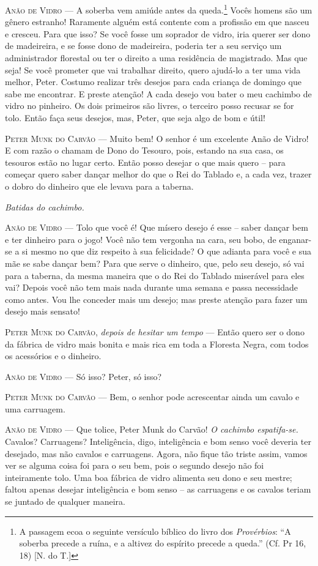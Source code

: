 \textsc{Anão de Vidro} --- A soberba vem amiúde antes da queda.\footnote{A
  passagem ecoa o seguinte versículo bíblico do livro dos
  \emph{Provérbios}: ``A soberba precede a ruína, e a altivez do
  espírito precede a queda.'' (Cf. Pr 16, 18) [N. do T.]} Vocês
homens são um gênero estranho! Raramente alguém está contente com a
profissão em que nasceu e cresceu. Para que isso? Se você fosse um
soprador de vidro, iria querer ser dono de madeireira, e se fosse dono
de madeireira, poderia ter a seu serviço um administrador florestal ou
ter o direito a uma residência de magistrado. Mas que seja! Se você
prometer que vai trabalhar direito, quero ajudá-lo a ter uma vida
melhor, Peter. Costumo realizar três desejos para cada criança de
domingo que sabe me encontrar. E preste atenção! A cada desejo vou bater
o meu cachimbo de vidro no pinheiro. Os dois primeiros são livres, o
terceiro posso recusar se for tolo. Então faça seus desejos, mas, Peter,
que seja algo de bom e útil!

\textsc{Peter Munk do Carvão} --- Muito bem! O senhor é um excelente Anão de
Vidro! E com razão o chamam de Dono do Tesouro, pois, estando na sua
casa, os tesouros estão no lugar certo. Então posso desejar o que mais
quero -- para começar quero saber dançar melhor do que o Rei do Tablado
e, a cada vez, trazer o dobro do dinheiro que ele levava para a taberna.

\emph{Batidas do cachimbo.}

\textsc{Anão de Vidro} --- Tolo que você é! Que mísero desejo é esse -- saber
dançar bem e ter dinheiro para o jogo! Você não tem vergonha na cara,
seu bobo, de enganar-se a si mesmo no que diz respeito à sua felicidade?
O que adianta para você e sua mãe se sabe dançar bem? Para que serve o
dinheiro, que, pelo seu desejo, só vai para a taberna, da mesma maneira
que o do Rei do Tablado miserável para eles vai? Depois você não tem
mais nada durante uma semana e passa necessidade como antes. Vou lhe
conceder mais um desejo; mas preste atenção para fazer um desejo mais
sensato!

\textsc{Peter Munk do Carvão}, \emph{depois de hesitar um tempo} --- Então quero
ser o dono da fábrica de vidro mais bonita e mais rica em toda a
Floresta Negra, com todos os acessórios e o dinheiro.

\textsc{Anão de Vidro} --- Só isso? Peter, só isso?

\textsc{Peter Munk do Carvão} --- Bem, o senhor pode acrescentar ainda um cavalo e
uma carruagem.

\textsc{Anão de Vidro} --- Que tolice, Peter Munk do Carvão! \emph{O cachimbo
espatifa-se.} Cavalos? Carruagens? Inteligência, digo, inteligência e
bom senso você deveria ter desejado, mas não cavalos e carruagens.
Agora, não fique tão triste assim, vamos ver se alguma coisa foi para o
seu bem, pois o segundo desejo não foi inteiramente tolo. Uma boa
fábrica de vidro alimenta seu dono e seu mestre; faltou apenas desejar
inteligência e bom senso -- as carruagens e os cavalos teriam se juntado
de qualquer maneira.

